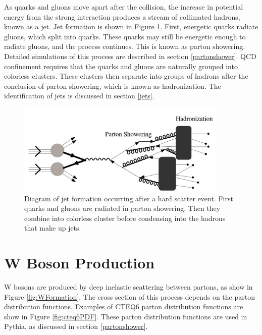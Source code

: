 \documentclass[oneside, letterpaper, oldfontcommands]{memoir}
\begin{document}
\qquad As quarks and gluons move apart after the collision, the increase in potential energy from the strong interaction produces a stream of collimated hadrons, known as a jet. Jet formation is shown in Figure \ref{fig:JetFormation}. First, energetic quarks radiate gluons, which split into quarks. These quarks may still be energetic enough to radiate gluons, and the process continues. This is known as parton showering. Detailed simulations of this process are described in section \ref{partonshower}. QCD confinement requires that the quarks and gluons are naturally grouped into colorless clusters. These clusters then separate into groups of hadrons after the conclusion of parton showering, which is known as hadronization. The identification of jets is discussed in section \ref{jets}. 

\begin{figure}[here]
\includegraphics[width=0.9\textwidth]{jetformation.jpg}
\caption{Diagram of jet formation occurring after a hard scatter event. First quarks and gluons are radiated in parton showering. Then they combine into colorless cluster before condensing into the hadrons that make up jets.}
\label{fig:JetFormation}
\end{figure}



\section{W Boson Production}\label{wboson}
\qquad W bosons are produced by deep inelastic scattering between partons, as show in Figure \ref{fig:WFormation}. The cross section of this process depends on the parton distribution functions. Examples of CTEQ6 parton distribution functions are show in Figure \ref{fig:cteq6PDF}\cite{Pumplin:2002vw}. These parton distribution functions are used in {\sc Pythia}, as discussed in section \ref{partonshower}.
\end{document}
